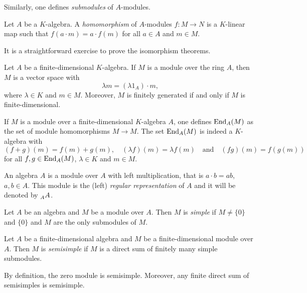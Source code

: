 Similarly, one defines \emph{submodules} of $A$-modules. 

\begin{definition}
Let $A$ be a $K$-algebra. 
A \emph{homomorphism} of $A$-modules 
$f\colon M\to N$ is a $K$-linear map such that $f(a\cdot m)=a\cdot f(m)$ for all
$a\in A$ and $m\in M$.  
\end{definition}

It is a straightforward exercise to 
prove the isomorphism theorems. 

Let $A$ be a finite-dimensional $K$-algebra. 
If $M$ is a module over the ring $A$, then $M$ is a vector space with  
\[
\lambda m=(\lambda 1_A)\cdot m, 
\]
where $\lambda\in K$ and $m\in M$. 
Moreover, $M$ is finitely generated if and only if $M$ is finite-dimensional.  

\begin{example}
If $M$ is a module over a finite-dimensional $K$-algebra $A$, one defines $\operatorname{End}_A(M)$ as the set
of module homomorphisms $M\to M$. The set  
$\operatorname{End}_A(M)$ is indeed a $K$-algebra with 
\[
(f+g)(m)=f(m)+g(m),\quad 
(\lambda f)(m)=\lambda f(m)
\quad\text{and}
\quad 
(fg)(m)=f(g(m))
\]
for all $f,g\in\operatorname{End}_A(M)$, 
$\lambda\in K$ and $m\in M$. 
\end{example}


\begin{example}
An algebra  $A$ is a module over $A$ with left multiplication, that is $a\cdot b=ab$, $a,b\in A$.
This module is the (left) \emph{regular representation} of $A$ and it will be denoted by $\prescript{}{A}{A}$. 
\end{example}

\begin{definition}
	Let $A$ be an algebra and $M$ be a module over $A$. Then 
	$M$ is \emph{simple} if $M\ne\{0\}$ and $\{0\}$ and $M$ 
	are the only submodules of $M$.	
\end{definition}

\begin{definition}
	Let $A$ be a finite-dimensional 
	algebra and $M$ be a finite-dimensional module over $A$. Then 
	$M$ is \emph{semisimple} if $M$ is a direct sum of 
	finitely many simple submodules.  
\end{definition}

By definition, the zero module is semisimple. Moreover, 
any finite direct sum of semisimples is semisimple. 

